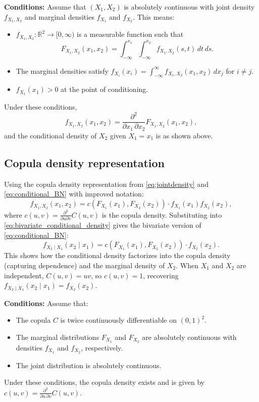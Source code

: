 \textbf{Conditions:} Assume that $(X_1,X_2)$ is absolutely continuous with joint density
$f_{X_1,X_2}$ and marginal densities $f_{X_1}$ and $f_{X_2}$. This means:
\begin{itemize}
\item $f_{X_1,X_2}:\mathbb{R}^2\to[0,\infty)$ is a measurable function such that
\[
F_{X_1,X_2}(x_1,x_2) = \int_{-\infty}^{x_1}\int_{-\infty}^{x_2} f_{X_1,X_2}(s,t)\,dt\,ds.
\]
\item The marginal densities satisfy $f_{X_i}(x_i) = \int_{-\infty}^{\infty} f_{X_1,X_2}(x_1,x_2)\,dx_j$ for $i\neq j$.
\item $f_{X_1}(x_1) > 0$ at the point of conditioning.
\end{itemize}
Under these conditions,
\[
f_{X_1,X_2}(x_1,x_2)
=
\frac{\partial^2}{\partial x_1\,\partial x_2}
F_{X_1,X_2}(x_1,x_2),
\]
and the conditional density of $X_2$ given $X_1=x_1$ is as shown above.
\subsection{Copula density representation}\label{subsec:bivariate_copula_density}
Using the copula density representation from \eqref{eq:jointdensity} and \eqref{eq:conditional_BN} with improved notation:
\begin{equation}\label{eq:bivariate_copula_density_representation}
f_{X_1,X_2}(x_1,x_2) = c(F_{X_1}(x_1), F_{X_2}(x_2)) \cdot f_{X_1}(x_1) f_{X_2}(x_2),
\end{equation}
where $c(u,v) = \frac{\partial^2}{\partial u \partial v} C(u,v)$ is the copula density. Substituting into \eqref{eq:bivariate_conditional_density} gives the bivariate version of \eqref{eq:conditional_BN}:
\begin{equation}\label{eq:bivariate_conditional_via_copula}
\boxed{f_{X_2\mid X_1}(x_2\mid x_1) = c(F_{X_1}(x_1), F_{X_2}(x_2)) \cdot f_{X_2}(x_2)}.
\end{equation}
This shows how the conditional density factorizes into the copula density (capturing dependence) and the marginal density of $X_2$. When $X_1$ and $X_2$ are independent, $C(u,v)=uv$, so $c(u,v)=1$, recovering $f_{X_2\mid X_1}(x_2\mid x_1)=f_{X_2}(x_2)$.

\textbf{Conditions:} Assume that:
\begin{itemize}
\item The copula $C$ is twice continuously differentiable on $(0,1)^2$.
\item The marginal distributions $F_{X_1}$ and $F_{X_2}$ are absolutely continuous with densities $f_{X_1}$ and $f_{X_2}$, respectively.
\item The joint distribution is absolutely continuous.
\end{itemize}
Under these conditions, the copula density exists and is given by $c(u,v) = \frac{\partial^2}{\partial u\,\partial v} C(u,v)$.


